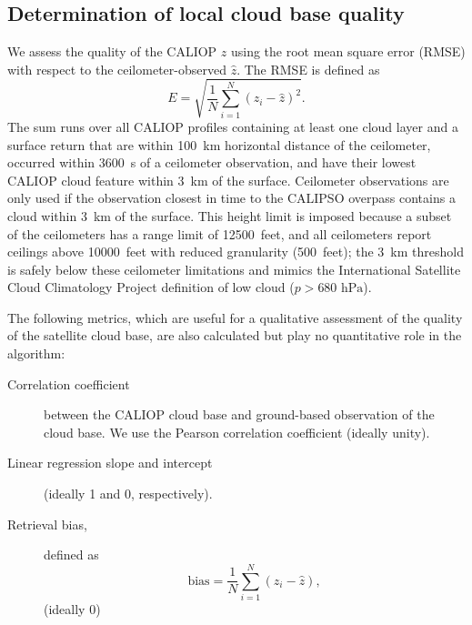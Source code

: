 \documentclass[essd,manuscript]{copernicus}\usepackage[]{graphicx}\usepackage[]{color}
\newcommand\CBH{\ensuremath{z}}
\begin{document}
\subsection{Determination of local cloud base quality}
\label{sec:algorithm:qual}
We assess the quality of the CALIOP \CBH{} using the root mean square error
(RMSE) with respect to the
ceilometer-observed $\hat{z}$.  The RMSE is defined as
\begin{equation}
  \label{eq:rmse}
  E = \sqrt{\frac{1}{N}\sum\limits_{i = 1}^{N}\left(z_i - \hat{z}\right)^2}.
\end{equation}
The sum runs over all CALIOP profiles containing at least one cloud layer and a
surface return that are within 100~km horizontal distance of the ceilometer,
occurred within 3600~s of a ceilometer observation, and have their lowest CALIOP
cloud feature within 3~km of the surface.  Ceilometer observations are only used
if the observation closest in time to the CALIPSO overpass contains a cloud
within 3~km of the surface.  This height limit is imposed because a subset of
the ceilometers has a range limit of 12500~feet, and all ceilometers report
ceilings above 10000~feet with reduced granularity (500~feet); the 3~km
threshold is safely below these ceilometer limitations and mimics the
International Satellite Cloud Climatology Project \citep[ISCCP,][]{Rossow1999}
definition of low cloud ($p > 680\text{ hPa}$).

The following metrics, which are useful for a qualitative assessment of the
quality of the satellite cloud base, are also calculated but play no
quantitative role in the algorithm:
\begin{description}
\item[Correlation coefficient] between the CALIOP cloud base and ground-based
  observation of the cloud base.  We use the Pearson correlation coefficient
  (ideally unity).  
\item[Linear regression slope and intercept] (ideally 1 and 0, respectively).  
\item[Retrieval bias,] defined as
  \begin{equation}
    \label{eq:bias}
    \mbox{bias} = \frac{1}{N}\sum\limits_{i = 1}^{N}\left(z_i - \hat{z}\right),
  \end{equation}(ideally 0)
\end{description}
\end{document}

